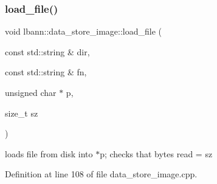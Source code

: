 \subsubsection{\texorpdfstring{load\+\_\+file()}{load\_file()}}
{\footnotesize\ttfamily void lbann\+::data\+\_\+store\+\_\+image\+::load\+\_\+file (\begin{DoxyParamCaption}\item[{const std\+::string \&}]{dir,  }\item[{const std\+::string \&}]{fn,  }\item[{unsigned char $\ast$}]{p,  }\item[{size\+\_\+t}]{sz }\end{DoxyParamCaption})\hspace{0.3cm}{\ttfamily [protected]}}



loads file from disk into $\ast$p; checks that bytes read = sz 



Definition at line 108 of file data\+\_\+store\+\_\+image.\+cpp.


